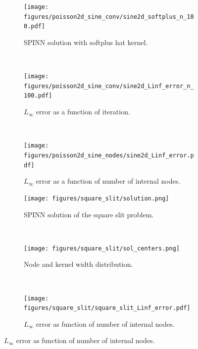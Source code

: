 \documentclass[12pt]{article}
\begin{document}
\begin{figure}
\begin{subfigure}{0.32\textwidth}
\centering
\texttt{[image: figures/poisson2d\_sine\_conv/sine2d\_softplus\_n\_100.pdf]}
\caption{SPINN solution with softplus hat kernel.}
\label{fig:2d_A_softplus_n_100}    
\end{subfigure}
~
\begin{subfigure}{0.32\textwidth}
\centering
\texttt{[image: figures/poisson2d\_sine\_conv/sine2d\_Linf\_error\_n\_100.pdf]}
\caption{$L_{\infty}$ error as a function of iteration.}
\label{fig:2d_A_Linf_n_100}      
\end{subfigure}
~
\begin{subfigure}{0.32\textwidth}
\centering
\texttt{[image: figures/poisson2d\_sine\_nodes/sine2d\_Linf\_error.pdf]}
\caption{$L_{\infty}$ error as a function of number of internal nodes.}
\label{fig:2d_A_Linf}
\end{subfigure}

\begin{subfigure}{0.32\textwidth}
\texttt{[image: figures/square\_slit/solution.png]}
\caption{SPINN solution of the square slit problem.}
\label{fig:poisson_2d_square_slit_sol}
\end{subfigure}
~
\begin{subfigure}{0.32\textwidth}
\texttt{[image: figures/square\_slit/sol\_centers.png]}
\caption{Node and kernel width distribution.}
\label{fig:poisson_2d_square_slit_nodes}
\end{subfigure}
~
\begin{subfigure}{0.32\textwidth}
\texttt{[image: figures/square\_slit/square\_slit\_Linf\_error.pdf]}
\caption{$L_{\infty}$ error as function of number of internal nodes.}
\label{fig:poisson_2d_square_slit_convergence}
\end{subfigure}


\end{figure}
\end{document}
